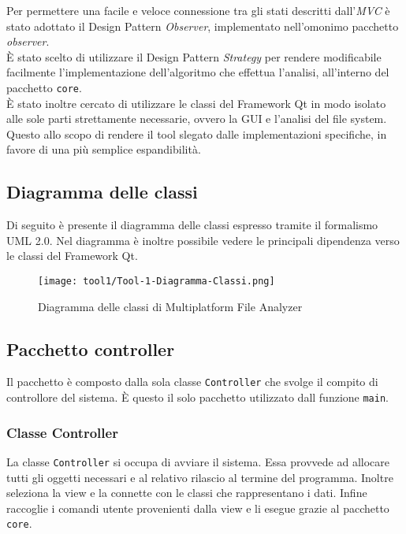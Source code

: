 	Per permettere una facile e veloce connessione tra gli stati descritti dall'\textit{MVC} è stato adottato il Design Pattern \textit{Observer}, implementato nell'omonimo pacchetto \textit{observer}.\\
	
	È stato scelto di utilizzare il Design Pattern \textit{Strategy} per rendere modificabile facilmente l'implementazione dell'algoritmo che effettua l'analisi, all'interno del pacchetto \texttt{core}.\\
	
	È stato inoltre cercato di utilizzare le classi del Framework Qt in modo isolato alle sole parti strettamente necessarie, ovvero la GUI e l'analisi del file system. Questo allo scopo di rendere il tool slegato dalle implementazioni specifiche, in favore di una più semplice espandibilità.

	\subsection{Diagramma delle classi}
		Di seguito è presente il diagramma delle classi espresso tramite il formalismo UML 2.0. Nel diagramma è inoltre possibile vedere le principali dipendenza verso le classi del Framework Qt.

		\begin{figure}[!h] 
			\centering 
			\texttt{[image: tool1/Tool-1-Diagramma-Classi.png]} 
			\caption{Diagramma delle classi di Multiplatform File Analyzer}
		\end{figure}

\newpage

\subsection{Pacchetto controller}
Il pacchetto è composto dalla sola classe \texttt{Controller} che svolge il compito di controllore del sistema. È questo il solo pacchetto utilizzato dall funzione \texttt{main}.

\subsubsection{Classe Controller}
La classe \texttt{Controller} si occupa di avviare il sistema. Essa provvede ad allocare tutti gli oggetti necessari e al relativo rilascio al termine del programma. Inoltre seleziona la view e la connette con le classi che rappresentano i dati. Infine raccoglie i comandi utente provenienti dalla view e li esegue grazie al pacchetto \texttt{core}.

